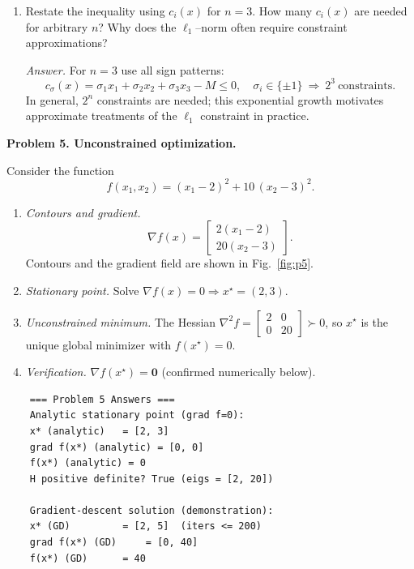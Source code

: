 \documentclass[11pt]{article}
\begin{document}
\begin{enumerate}[label=4(\alph*)]
	\item Restate the inequality using $c_i(x)$ for $n=3$.  
	How many $c_i(x)$ are needed for arbitrary $n$?  
	Why does the $\ell_1$–norm often require constraint approximations?
	
	\emph{Answer.}
	For $n=3$ use all sign patterns:
	\[
	c_{\sigma}(x)=\sigma_1 x_1+\sigma_2 x_2+\sigma_3 x_3 - M \le 0,
	\quad \sigma_i\in\{\pm1\}\ \Rightarrow\ 2^3\ \text{constraints}.
	\]
	In general, $2^n$ constraints are needed; this exponential growth motivates approximate treatments of the $\ell_1$ constraint in practice.
	
\end{enumerate}

\newpage
	
\textbf{Problem 5. Unconstrained optimization.}

Consider the function
\[
f(x_1,x_2) = (x_1 - 2)^2 + 10\,(x_2 - 3)^2.
\]

\begin{enumerate}[label=\arabic*)]
	\item \emph{Contours and gradient.}
	\[
	\nabla f(x)=\begin{bmatrix}2(x_1-2)\\ 20(x_2-3)\end{bmatrix}.
	\]
	Contours and the gradient field are shown in Fig.~\ref{fig:p5}.
	
	\item \emph{Stationary point.}
	Solve $\nabla f(x)=0 \Rightarrow x^\star=(2,3)$.
	
	\item \emph{Unconstrained minimum.}
	The Hessian $\nabla^2 f=\begin{bmatrix}2&0\\0&20\end{bmatrix}\succ0$, so $x^\star$ is the unique global minimizer with $f(x^\star)=0$.
	
	\item \emph{Verification.}
	$\nabla f(x^\star)=\mathbf{0}$ (confirmed numerically below).
\end{enumerate}

\begin{verbatim}
	=== Problem 5 Answers ===
	Analytic stationary point (grad f=0):
	x* (analytic)   = [2, 3]
	grad f(x*) (analytic) = [0, 0]
	f(x*) (analytic) = 0
	H positive definite? True (eigs = [2, 20])
	
	Gradient-descent solution (demonstration):
	x* (GD)         = [2, 5]  (iters <= 200)
	grad f(x*) (GD)     = [0, 40]
	f(x*) (GD)      = 40
\end{verbatim}
\end{document}
